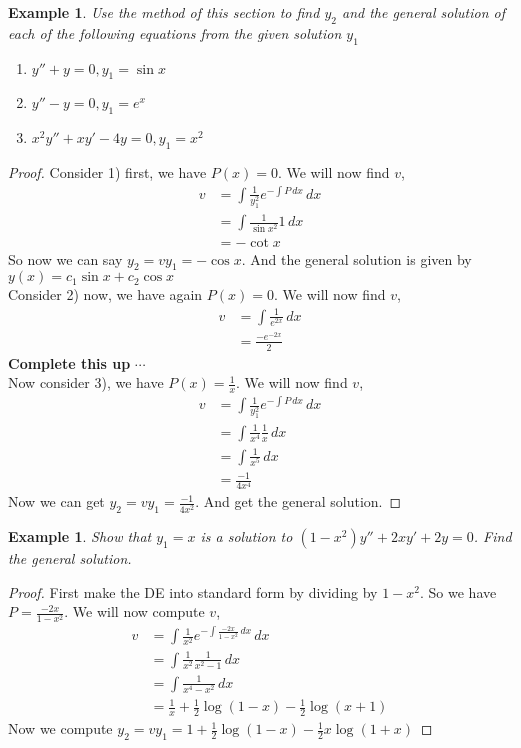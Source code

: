 \documentclass[oneside,11pt,pdftex,final]{book}%
\numberwithin{equation}{section}
\newtheorem{example}[theorem]{Example}
\numberwithin{section}{chapter}
\numberwithin{equation}{chapter}
\begin{document}
\begin{example}
	Use the method of this section to find $ y_2 $ and the general solution of each of the following equations from the given solution $ y_1 $
	\begin{enumerate}
		\item $ y''+y=0, y_1=\sin x $
		\item $ y''-y=0, y_1=e^x $
		\item $ x^2y''+xy'-4y=0, y_1=x^2 $
	\end{enumerate}
\end{example}

\begin{proof}
	Consider 1) first, we have $ P(x)=0$. We will now find $ v $,
	\begin{align*}
		v&=\int \frac{1}{y_1^2} e^{- \int P\, dx}\, dx\\
		&= \int \frac{1}{\sin x^2} 1\, dx\\
		&= -\cot x
	\end{align*}
So now we can say $ y_2=v y_1= - \cos x  $. And the general solution is given by $ y(x) =c_1 \sin x + c_2 \cos x $\\
Consider 2) now, we have again $ P(x) =0$.
We will now find $ v $,
\begin{align*}
	v&=\int \frac{1}{e^{2x}}\, dx\\
	&=\frac{-e^{-2x}}{2}
\end{align*}
\textbf{Complete this up} $ \cdots $\\
Now consider 3), we have $ P(x)=\frac{1}{x} $. We will now find $ v $,
\begin{align*}
	v&=\int \frac{1}{y_1^2} e^{-\int P\, dx}\, dx\\
	&= \int \frac{1}{x^4} \frac{1}{x}\, dx\\
	&= \int \frac{1}{x^5}\, dx\\
	&= \frac{-1}{4x^4}
\end{align*}
Now we can get $ y_2=vy_1=\frac{-1}{4x^2} $. And get the general solution.
\end{proof}

\begin{example}
	Show that $ y_1=x $ is a solution to $ (1-x^2)y''+2xy'+2y=0 $. Find the general solution.
\end{example}
\begin{proof}
	First make the DE into standard form by dividing by $ 1-x^2 $. So we have $ P=\frac{-2x}{1-x^2} $. We will now compute $ v $,
	\begin{align*}
		v&=\int \frac{1}{x^2} e^{- \int \frac{-2x}{1-x^2}\, dx }\, dx\\
		&= \int \frac{1}{x^2} \frac{1}{x^2-1}\, dx\\
		&= \int \frac{1}{x^4-x^2}\, dx\\
		&= \frac{1}{x}+\frac{1}{2}\log(1-x)-\frac{1}{2} \log(x+1)
	\end{align*}
	Now we compute $ y_2=v y_1=1+\frac{1}{2} \log (1-x)-\frac{1}{2} x \log(1+x)$
\end{proof}
\end{document}

